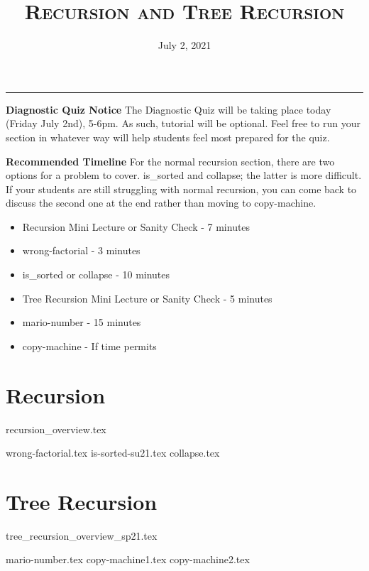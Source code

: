 \documentclass{exam}
\title{\textsc{Recursion and Tree Recursion}}
\date{July 2, 2021}
\begin{document}
\maketitle
\rule{\textwidth}{0.15em}
\fontsize{12}{15}\selectfont

\begin{guide}
\textbf{Diagnostic Quiz Notice}
    \newline
    The Diagnostic Quiz will be taking place today (Friday July 2nd), 5-6pm. As such, tutorial will be optional.
    Feel free to run your section in whatever way will help students feel most prepared for the quiz.
\end{guide}

\begin{guide}
\textbf{Recommended Timeline}
\newline
For the normal recursion section, there are two options for a problem to cover. is\_sorted and collapse; the latter is more difficult.
If your students are still struggling with normal recursion, you can come back to discuss the second one at the end rather than moving
to copy-machine.
\begin{itemize}
    \item Recursion Mini Lecture or Sanity Check - 7 minutes
    \item wrong-factorial - 3 minutes
    \item is\_sorted or collapse - 10 minutes
    \item Tree Recursion Mini Lecture or Sanity Check - 5 minutes
    \item mario-number - 15 minutes
    \item copy-machine - If time permits
\end{itemize}
\end{guide}

\section{Recursion}
{recursion_overview.tex}
\begin{questions}
    {wrong-factorial.tex}
    \pagebreak
    {is-sorted-su21.tex}
    \pagebreak
    {collapse.tex}
\end{questions}

\pagebreak

\section{Tree Recursion}
{tree_recursion_overview_sp21.tex}
\pagebreak
\begin{questions}
{mario-number.tex}
\pagebreak
{copy-machine1.tex}
\pagebreak
{copy-machine2.tex}
\end{questions}
\end{document}
